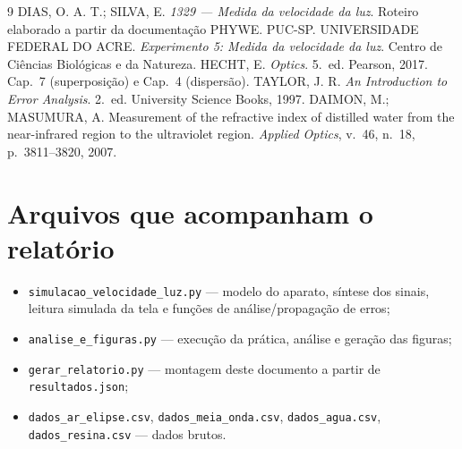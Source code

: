 \documentclass[11pt,a4paper]{article}
\begin{document}
\begin{thebibliography}{9}
 DIAS, O. A. T.; SILVA, E. \emph{1329 --- Medida da velocidade
da luz}. Roteiro elaborado a partir da documentação PHYWE. PUC-SP.
 UNIVERSIDADE FEDERAL DO ACRE. \emph{Experimento 5: Medida da
velocidade da luz}. Centro de Ciências Biológicas e da Natureza.
 HECHT, E. \emph{Optics}. 5.~ed. Pearson, 2017. Cap.~7
(superposição) e Cap.~4 (dispersão).
 TAYLOR, J. R. \emph{An Introduction to Error Analysis}.
2.~ed. University Science Books, 1997.
 DAIMON, M.; MASUMURA, A. Measurement of the refractive index
of distilled water from the near-infrared region to the ultraviolet region.
\emph{Applied Optics}, v.~46, n.~18, p.~3811--3820, 2007.
\end{thebibliography}

\appendix
\section{Arquivos que acompanham o relatório}
\begin{itemize}\setlength\itemsep{1pt}
\item \texttt{simulacao\_velocidade\_luz.py} --- modelo do aparato, síntese dos
      sinais, leitura simulada da tela e funções de análise/propagação de erros;
\item \texttt{analise\_e\_figuras.py} --- execução da prática, análise e geração
      das figuras;
\item \texttt{gerar\_relatorio.py} --- montagem deste documento a partir de
      \texttt{resultados.json};
\item \texttt{dados\_ar\_elipse.csv}, \texttt{dados\_meia\_onda.csv},
      \texttt{dados\_agua.csv}, \texttt{dados\_resina.csv} --- dados brutos.
\end{itemize}
\end{document}
